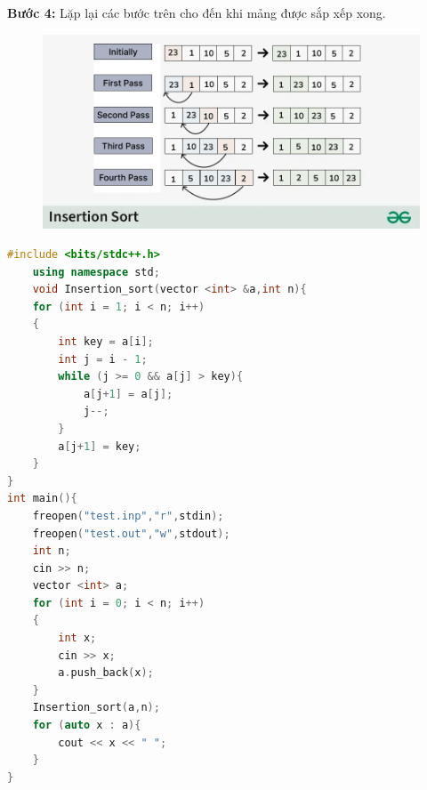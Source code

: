 \documentclass[12pt]{article}
\begin{document}
    \textbf{Bước 4:} Lặp lại các bước trên cho đến khi mảng được sắp xếp xong.
\endgroup
\begin{figure}
    \includegraphics[width=12cm]{Insertion-sorting.jpg}
\end{figure}
\begin{lstlisting}[language = C++]
    #include <bits/stdc++.h>
    using namespace std;
    void Insertion_sort(vector <int> &a,int n){
    for (int i = 1; i < n; i++)
    {
        int key = a[i];
        int j = i - 1;
        while (j >= 0 && a[j] > key){
            a[j+1] = a[j];
            j--;
        }
        a[j+1] = key;
    }
}
int main(){
    freopen("test.inp","r",stdin);
    freopen("test.out","w",stdout);
    int n;
    cin >> n;
    vector <int> a;
    for (int i = 0; i < n; i++)
    {
        int x;
        cin >> x;
        a.push_back(x);
    }
    Insertion_sort(a,n);
    for (auto x : a){
        cout << x << " ";
    }
}
\end{lstlisting}
\end{document}
